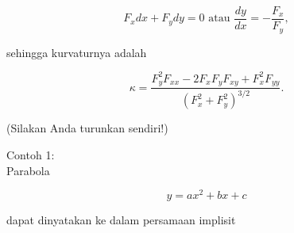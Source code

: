 \documentclass[a4paper,10pt]{article}
\begin{document}
\begin{eulernotebook}
\begin{eulercomment}
\begin{eulercomment}
\begin{eulercomment}
\begin{eulercomment}
\begin{eulercomment}
\begin{eulercomment}
\begin{eulercomment}
\begin{eulercomment}
\begin{eulercomment}
\begin{eulercomment}
\begin{eulercomment}
\begin{eulercomment}
\begin{eulercomment}
\begin{eulercomment}
\begin{eulercomment}
\begin{eulercomment}
\begin{eulercomment}
\begin{eulercomment}
\begin{eulercomment}
\begin{eulercomment}
\begin{eulercomment}
\end{eulercomment}
\begin{eulerformula}
\[
F_x dx+ F_y dy = 0\text{ atau } \frac{dy}{dx}=-\frac{F_x}{F_y},
\]
\end{eulerformula}
\begin{eulercomment}
sehingga kurvaturnya adalah

\end{eulercomment}
\begin{eulerformula}
\[
\kappa =\frac {F_y^2F_{xx}-2F_xF_yF_{xy}+F_x^2F_{yy}}{\left(F_x^2+F_y^2\right)^{3/2}}.
\]
\end{eulerformula}
\begin{eulercomment}
(Silakan Anda turunkan sendiri!)

Contoh 1:\\
Parabola 

\end{eulercomment}
\begin{eulerformula}
\[
y=ax^2+bx+c
\]
\end{eulerformula}
\begin{eulercomment}
dapat dinyatakan ke dalam persamaan implisit


\end{eulercomment}
\end{eulercomment}
\end{eulercomment}
\end{eulercomment}
\end{eulercomment}
\end{eulercomment}
\end{eulercomment}
\end{eulercomment}
\end{eulercomment}
\end{eulercomment}
\end{eulercomment}
\end{eulercomment}
\end{eulercomment}
\end{eulercomment}
\end{eulercomment}
\end{eulercomment}
\end{eulercomment}
\end{eulercomment}
\end{eulercomment}
\end{eulercomment}
\end{eulercomment}
\end{eulernotebook}
\end{document}
